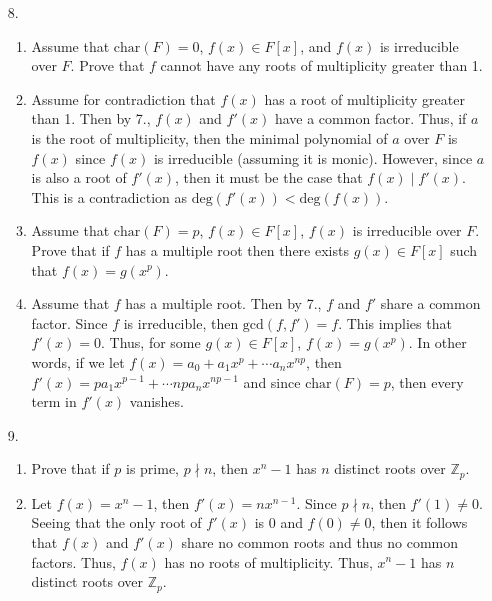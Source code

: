\documentclass[12pt]{article}
\makeatletter
\theoremstyle{definition}
\theoremstyle{remark}
\renewenvironment{proof}[1][\proofname]{\par
  \pushQED{\qed}%
  \normalfont \topsep6\p@\@plus6\p@\relax
  \list{}{\leftmargin=0mm
          \rightmargin=4mm
          \settowidth{\itemindent}{\itshape#1}%
          \labelwidth=\itemindent
          \parsep=0pt \listparindent=\parindent 
  }
  \item[\hskip\labelsep
        \itshape
    #1\@addpunct{.}]\ignorespaces
}{%
  \popQED\endlist\@endpefalse
}
\let\oldproofname=\proofname
\renewcommand{\proofname}{\bf{\textit{\oldproofname}}}
\makeatother
\begin{document}
\begin{enumerate}[leftmargin=*]
        \item[8.] \hfill\par
            \begin{enumerate}
                \item Assume that $\text{char}(F)=0$, $f(x)\in F[x]$, and $f(x)$ is irreducible over $F$. Prove that $f$ cannot have any roots of multiplicity greater than 1.
                    \begin{proof}
                        Assume for contradiction that $f(x)$ has a root of multiplicity greater than 1. Then by 7., $f(x)$ and $f'(x)$ have a common factor. Thus, if $a$ is the root of multiplicity, then the minimal polynomial of $a$ over $F$ is $f(x)$ since $f(x)$ is irreducible (assuming it is monic). However, since $a$ is also a root of $f'(x)$, then it must be the case that $f(x)\mid f'(x)$. This is a contradiction as $\text{deg}(f'(x))<\text{deg}(f(x))$.
                    \end{proof}
                \item Assume that $\text{char}(F)=p$, $f(x)\in F[x]$, $f(x)$ is irreducible over $F$. Prove that if $f$ has a multiple root then there exists $g(x)\in F[x]$ such that $f(x)=g(x^p)$.
                    \begin{proof}
                        Assume that $f$ has a multiple root. Then by 7., $f$ and $f'$ share a common factor. Since $f$ is irreducible, then $\text{gcd}(f,f')=f$. This implies that $f'(x)=0$. Thus, for some $g(x)\in F[x]$, $f(x)=g(x^p)$. In other words, if we let $f(x)=a_0+a_1x^p+\cdots a_nx^{np}$, then $f'(x)=pa_1x^{p-1}+\cdots npa_nx^{np-1}$ and since $\text{char}(F)=p$, then every term in $f'(x)$ vanishes.  
                    \end{proof}
            \end{enumerate}
        \item[9.] \hfill\par 
            \begin{enumerate}
                \item Prove that if $p$ is prime, $p\nmid n$, then $x^n-1$ has $n$ distinct roots over $\mathbb{Z}_p$.
                    \begin{proof}
                        Let $f(x)=x^n-1$, then $f'(x)=nx^{n-1}$. Since $p\nmid n$, then $f'(1)\neq 0$. Seeing that the only root of $f'(x)$ is 0 and $f(0)\neq 0$, then it follows that $f(x)$ and $f'(x)$ share no common roots and thus no common factors. Thus, $f(x)$ has no roots of multiplicity. Thus, $x^n-1$ has $n$ distinct roots over $\mathbb{Z}_p$.

\end{proof}
\end{enumerate}
\end{enumerate}
\end{document}
